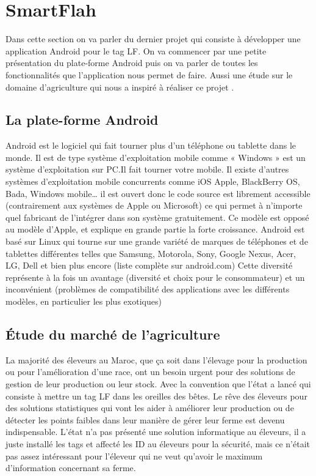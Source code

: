 \documentclass[11pt, a4paper, twoside]{book}
\begin{document}
\section{SmartFlah}
Dans cette section on va parler du dernier projet qui consiste à développer une application Android pour le tag LF. On va commencer par une petite présentation du plate-forme Android puis on va parler de toutes les fonctionnalités que l'application nous permet de faire. Aussi une étude sur le domaine d'agriculture qui nous a inspiré à réaliser ce projet .\\
\subsection{La plate-forme Android}
Android est le logiciel qui fait tourner plus d’un téléphone ou tablette dans le monde.
Il est de type système d’exploitation mobile comme « Windows » est un système d’exploitation sur PC.Il fait tourner votre mobile. Il existe d’autres systèmes d’exploitation mobile concurrents comme iOS Apple, BlackBerry OS, Bada, Windows mobile… il est ouvert donc le code source est librement accessible (contrairement aux systèmes de Apple ou Microsoft) ce qui permet à n’importe quel fabricant de l’intégrer dans son système gratuitement. Ce modèle est opposé au modèle d'Apple, et explique en grande partie la forte croissance. Android est basé sur Linux qui tourne sur une grande variété de marques de téléphones et de tablettes différentes telles que Samsung, Motorola, Sony, Google Nexus, Acer, LG, Dell et bien plus encore (liste complète sur android.com) Cette diversité représente à la fois un avantage (diversité et choix pour le consommateur) et un inconvénient (problèmes de compatibilité des applications avec les différents modèles, en particulier les plus exotiques)
\subsection{Étude du marché de l'agriculture}
La majorité des éleveurs au Maroc, que ça soit dans l'élevage pour la production ou pour l'amélioration d'une race, ont un besoin urgent pour des solutions de gestion de leur production ou leur stock. Avec la convention que l'état a lancé qui consiste à mettre un tag LF dans les oreilles des bêtes. Le rêve des éleveurs pour des solutions statistiques qui vont les aider à améliorer leur production ou de détecter les points faibles dans leur manière de gérer leur ferme est devenu indispensable. L'état n'a pas présenté une solution informatique au éleveurs, il a juste installé les tags et affecté les ID au éleveurs pour la sécurité, mais ce n'était pas assez intéressant pour l’éleveur qui ne veut qu'avoir le maximum d'information concernant sa ferme.\\
\end{document}
